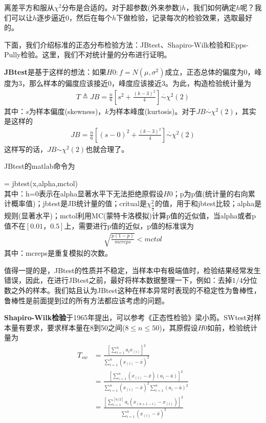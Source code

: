         离差平方和服从$\chi^2$分布是合适的。对于超参数(外来参数)$h$，我们如何确定$h$呢？我们可以让$h$逐步逼近0，然后在每个$h$下做检验，记录每次的检验效果，选取最好的。
        \par
        下面，我们介绍标准的正态分布检验方法：JBtest、Shapiro-Wilk检验和Epps-Pully检验。这里，我们不对统计量的分布进行证明。
        \par
        \textbf{JBtest}是基于这样的想法：如果$H0:f = N(\mu,\sigma^2)$成立，正态总体的偏度为0，峰度为3，那么样本的偏度应该接近0，峰度应该接近3。为此，构造检验统计量为
        \begin{align*}
        T \triangleq JB = \frac{n}{6}\left[ s^2+\frac{(k-3)^2}{4}  \right] \overset{\cdot}{\sim} \chi^2(2)
        \end{align*}
        其中：$s$为样本偏度(skewness)，$k$为样本峰度(kurtosis)。对于$JB\overset{\cdot}{\sim} \chi^2(2)$，其实是这样的
        \begin{align*}
        JB = \frac{n}{6}\left[ (s-0)^2+\frac{(k-3)^2}{4}  \right] \overset{\cdot}{\sim} \chi^2(2)
        \end{align*}
        这样写的话，$JB\overset{\cdot}{\sim} \chi^2(2)$也就合理了。
        \par
        JBtest的matlab命令为
        \par
        [h,p,jbtest,critral] = jbtest(x,alpha,mctol)\\
        其中：h=0表示在alpha显著水平下无法拒绝原假设$H0$；p为p值(统计量的右向累计概率值)；jbtest是JB统计量的值；critual是$\chi^2_{\frac{\alpha}{2}}$的值，用于和jbtest比较；alpha是规则(显著水平)；mctol利用MC(蒙特卡洛模拟)计算p值的近似值，当alpha或者p值不在$[0.01，0.5]$上，需要进行p值的近似，p值的标准误为
        \begin{align*}
        \sqrt{\frac{p(1-p)}{mcreps}} <mctol
        \end{align*}
        其中：mcreps是重复模拟的次数。
        \par
        值得一提的是，JBtest的性质并不稳定，当样本中有极端值时，检验结果经常发生错误，因此，在进行JBtest之前，最好将样本数据整理一下，例如：去掉$1/4$分位数之外的样本。我们姑且认为JBtest这种在样本异常时表现的不稳定性为鲁棒性，鲁棒性是前面提到过的所有方法都应该考虑的问题。
        \par
        \textbf{Shapiro-Wilk检验}于1965年提出，可以参考《正态性检验》梁小筠。SWtest对样本量有要求，要求样本量在8到50之间($8 \leqslant n \leqslant50$)，其原假设$H0$如前，检验统计量为
        \begin{align*}
        T_{sw} &= \frac{\left[\sum\limits_{i = 1}^na_ix_{(i)}\right]^2}{\sum\limits_{i=1}^n(x_{(i)}-\bar{x})^2} \\
        &=\frac{\left[\sum\limits_{i=1}^n(x_{(i)} - \bar{x})(a_i-\bar{a})\right]^2}{\sum\limits_{i=1}^n(x_{(i)}-\bar{x})^2\sum\limits_{i=1}^n(a_{i}-\bar{a})^2} \\
        &=\frac{\left[ \sum\limits_{i=1}^{[n/2]} a_i(x_{(n+1-i)} - x_{(i)})\right]^2}{\sum\limits_{i=1}^n(x_{(i)} - \bar{x})^2}
        \end{align*}
